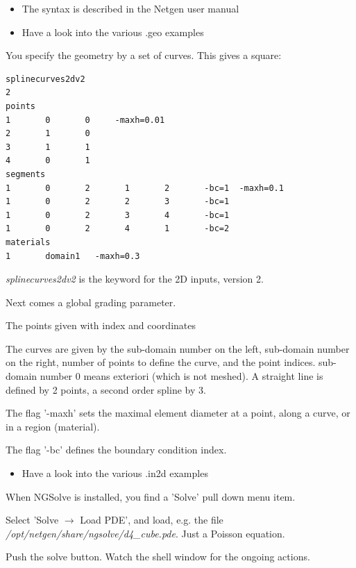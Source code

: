 \documentclass[20pt,landscape,footrule]{foils}
\newcommand\sectionname{}
\begin{document}
\begin{itemize}
\item The syntax is described in the Netgen user manual
\item Have a look into the various .geo examples
\end{itemize}


\foilhead{\color{blue}
{\bf The 2D Files} \\[-1em] }
You specify the geometry by a set of curves. This gives a square:
\begin{verbatim}
splinecurves2dv2
2
points
1       0       0     -maxh=0.01
2       1       0
3       1       1
4       0       1
segments
1       0       2       1       2       -bc=1  -maxh=0.1
1       0       2       2       3       -bc=1
1       0       2       3       4       -bc=1
1       0       2       4       1       -bc=2
materials
1       domain1   -maxh=0.3
\end{verbatim}
\newpage

{\em splinecurves2dv2} is the keyword for the 2D inputs, version 2. 

Next comes a global grading parameter.

The points given with index and coordinates

The curves are given by the sub-domain number on the left, sub-domain number on the right, number of points to define the curve, and the point indices. sub-domain number 0 means exteriori (which is not meshed). A straight line is defined by 2 points, a second order spline by 3. 

The flag '-maxh' sets the  maximal element diameter  at a point, along a curve, or in a region (material).

The flag '-bc' defines the boundary condition index.

\begin{itemize}
\item Have a look into the various .in2d examples
\end{itemize}

\foilhead{\color{blue}
{\bf Running NGSolve} \\ }
\hypertarget{runngsolve}{}
\renewcommand\sectionname{Running NGSolve}

When NGSolve is installed, you find a 'Solve' pull down menu item. 

Select 'Solve $\rightarrow$ Load PDE', and load, e.g. the file {\em /opt/netgen/share/ngsolve/d4\_cube.pde}. Just a Poisson equation.

Push the solve button. Watch the shell window for the ongoing actions.
\end{document}
